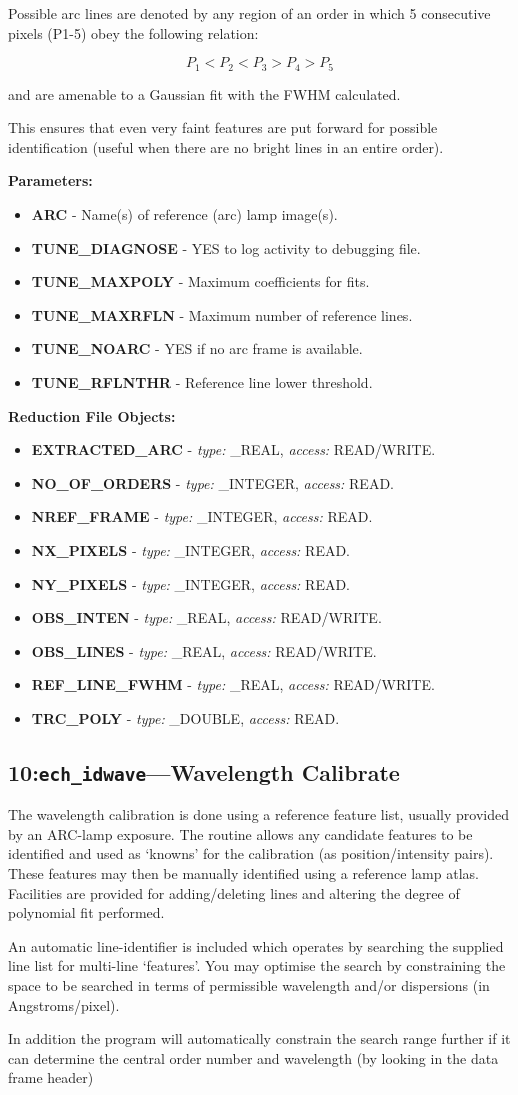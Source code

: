 \documentclass[11pt,twoside]{article}
\makeatletter
\newcommand{\stardocinitials}  {SUN}
\newcommand{\stardocnumber}    {152.4}
\newcommand{\stardocname}{\stardocinitials /\stardocnumber}
\newcommand{\htmlref}[2]{#1}
\newcommand{\xlabel}[1]{}
\newcommand{\sunspec}[2]{#1}
\renewcommand{\sunspec}[2]{#2}
\newcommand{\myindex}[1]{\index{#1}}
\renewcommand{\myindex}[1]{}
\newcommand{\cmdname}{\begingroup \catcode`\_=12 \realcmdname}
\newcommand{\realcmdname}[1]{\endgroup\texttt{#1}}
\newlength{\sstbannerlength}
\newlength{\sstcaptionlength}
\newcommand{\echtask}[4]{
   \goodbreak
   \rule{\textwidth}{0.5mm}
   \vspace{-7ex}
   \newline
   \settowidth{\sstbannerlength}{{\Large {\bf #3}}}
   \setlength{\sstcaptionlength}{\textwidth}
   \addtolength{\sstbannerlength}{0.5em}
   \addtolength{\sstcaptionlength}{-2.0\sstbannerlength}
   \addtolength{\sstcaptionlength}{-5.0pt}
   \parbox[t]{\sstbannerlength}{\flushleft{\Large {\bf #3}}}
   \parbox[t]{\sstcaptionlength}{\center{\Large #4}}
   \parbox[t]{\sstbannerlength}{\flushright{\Large {\bf #3}}}
   \label{#1}\label{#2}
   \markboth{#3}{\stardocname}
   \uppercase{\myindex{#2@\protect\cmdname{#2}}}
}
\renewcommand{\echtask}[4]
{
  \subsection{\xlabel{#1}\xlabel{#2}\label{#1}\label{#2}#3---#4}
  \markboth{#3}{\stardocname}
}
\newcommand{\echpars}[1]{
{\bf Parameters:\vspace*{6pt}\\}
    #1
}
\renewcommand{\echpars}[1]{
{\bf Parameters:}
\begin{itemize}
#1
\end{itemize}
}
\newcommand{\epar}[3]
{
    \hspace*{5mm}\makebox[50mm][l]{\bf #1} #2 (p~\pageref{par_#3}.)\\
}
\renewcommand{\epar}[3]
{\item \htmlref{{\bf #1}}{par_#3} - #2}
\newcommand{\lepar}[3]
{
    \hspace*{5mm}\makebox[50mm][l]{\bf #1} #2 (p~\pageref{par_#3}.)
}
\renewcommand{\lepar}[3]
{\item \htmlref{{\bf #1}}{par_#3} - #2}
\newcommand{\echredobj}[1]{
{\bf Reduction File Objects:\vspace*{6pt}\\}
      \hspace*{5mm}\makebox[50mm][l]{Object}\makebox[25mm][l]{Type}{Access}\\
      #1
}
\renewcommand{\echredobj}[1]{
{\bf Reduction File Objects:}
\begin{itemize}
#1
\end{itemize}
}
\newcommand{\eobj}[3]
{
    \hspace*{5mm}\makebox[50mm][l]{\bf #1}\makebox[25mm][l]{\tt #2}{\tt #3}\\
}
\renewcommand{\eobj}[3]
{\item {\bf #1} - {\it type:} #2, {\it access:} #3.}
\newcommand{\leobj}[3]
{
    \hspace*{5mm}\makebox[50mm][l]{\bf #1}\makebox[25mm][l]{\tt #2}{\tt #3}
}
\renewcommand{\leobj}[3]
{\item {\bf #1} - {\it type:} #2, {\it access:} #3.}
\makeatother
\begin{document}
Possible arc lines are denoted by any region of an order in which 5
consecutive pixels (P1\sunspec{--}{-}5) obey the following relation:

\begin{displaymath}
P_{1} < P_{2} < P_{3} > P_{4} > P_{5}
\end{displaymath}


and are amenable to a Gaussian fit with the FWHM calculated.

This ensures that even very faint features are put forward for possible
identification (useful when there are no bright lines in an entire
order).

\echpars{
\epar{ARC}{Name(s) of reference (arc) lamp image(s).}{ARC}
\epar{TUNE\_DIAGNOSE}{YES to log activity to debugging file.}{TUNE_DIAGNOSE}
\epar{TUNE\_MAXPOLY}{Maximum coefficients for fits.}{TUNE_MAXPOLY}
\epar{TUNE\_MAXRFLN}{Maximum number of reference lines.}{TUNE_MAXRFLN}
\epar{TUNE\_NOARC}{YES if no arc frame is available.}{TUNE_NOARC}
\lepar{TUNE\_RFLNTHR}{Reference line lower threshold.}{TUNE_RFLNTHR}
}


\echredobj{
\eobj{EXTRACTED\_ARC}{\_REAL}{READ/WRITE}
\eobj{NO\_OF\_ORDERS}{\_INTEGER}{READ}
\eobj{NREF\_FRAME}{\_INTEGER}{READ}
\eobj{NX\_PIXELS}{\_INTEGER}{READ}
\eobj{NY\_PIXELS}{\_INTEGER}{READ}
\eobj{OBS\_INTEN}{\_REAL}{READ/WRITE}
\eobj{OBS\_LINES}{\_REAL}{READ/WRITE}
\eobj{REF\_LINE\_FWHM}{\_REAL}{READ/WRITE}
\leobj{TRC\_POLY}{\_DOUBLE}{READ}
}


\echtask{option10}{ech_idwave}{10:{\tt ech\_idwave}}{Wavelength Calibrate}
\myindex{Wavelength calibration}
\myindex{Arc line!calibration}

The wavelength calibration is done using a reference feature list, usually
provided by an ARC-lamp exposure. The routine allows any candidate features
to be identified and used as `knowns' for the calibration (as
position/intensity pairs). These features may then be manually identified
using a reference lamp atlas. Facilities are provided for adding/deleting
lines and altering the degree of polynomial fit performed.

An automatic line-identifier is included which operates by searching the
supplied line list for multi-line `features'.
You may optimise the search by constraining the space to be searched in
terms of permissible wavelength and/or dispersions (in Angstroms/pixel).

In addition the program will automatically constrain the search range
further if it can determine the central order number and wavelength (by
looking in the data frame header)
\end{document}
